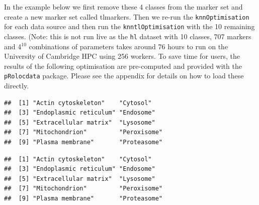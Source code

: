 In the example below we first remove these 4 classes from the marker set
and create a new marker set called tlmarkers. Then we
re-run the \texttt{knnOptimisation} for each data source and then run
the \texttt{knntlOptimisation} with the 10 remaining classes. (Note:
this is not run live as the \texttt{hl} dataset with 10 classes,
707 markers and 4$^{10}$ combinations of parameters takes around 76
hours to run on the University of Cambridge HPC using 256 workers.
To save time for users, the results of the following optimisation
are pre-computed and provided with the \texttt{pRolocdata} package.
Please see the appendix for details on how
to load these directly.



\begin{knitrout}
\color{fgcolor}\begin{kframe}
\begin{alltt}
\hlopt{$} \hlkwb{<-} \hlopt{$}
\hlopt{$} \hlkwb{<-} \hlopt{$}

  \hlkwb{<-} \hlstd{(}\hlstd{,} \hlstd{,}
           \hlstd{,}
           \hlstd{)}
   
   \hlkwb{<-}     \hlstd{=} \hlstd{)}
   \hlkwb{<-}     \hlstd{=} \hlstd{)}
\hlstd{\}}
  \hlstd{=} \hlstd{)}
\end{alltt}
\begin{verbatim}
##  [1] "Actin cytoskeleton"    "Cytosol"              
##  [3] "Endoplasmic reticulum" "Endosome"             
##  [5] "Extracellular matrix"  "Lysosome"             
##  [7] "Mitochondrion"         "Peroxisome"           
##  [9] "Plasma membrane"       "Proteasome"
\end{verbatim}
\begin{alltt}
  \hlstd{=} \hlstd{)}
\end{alltt}
\begin{verbatim}
##  [1] "Actin cytoskeleton"    "Cytosol"              
##  [3] "Endoplasmic reticulum" "Endosome"             
##  [5] "Extracellular matrix"  "Lysosome"             
##  [7] "Mitochondrion"         "Peroxisome"           
##  [9] "Plasma membrane"       "Proteasome"
\end{verbatim}
\end{kframe}
\end{knitrout}

